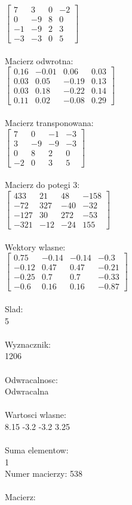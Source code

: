 \documentclass[a4paper,12pt]{article}
\begin{document}
$\begin{bmatrix} 7&3&0&-2\\0&-9&8&0\\-1&-9&2&3\\-3&-3&0&5 \end{bmatrix}$
\\
\\
Macierz odwrotna:\\

$\begin{bmatrix} 0.16&-0.01&0.06&0.03\\0.03&0.05&-0.19&0.13\\0.03&0.18&-0.22&0.14\\0.11&0.02&-0.08&0.29 \end{bmatrix}$
\\
\\
Macierz transponowana:\\

$\begin{bmatrix} 7&0&-1&-3\\3&-9&-9&-3\\0&8&2&0\\-2&0&3&5 \end{bmatrix}$
\\
\\
Macierz do potegi 3:\\

$\begin{bmatrix} 433&21&48&-158\\-72&327&-40&-32\\-127&30&272&-53\\-321&-12&-24&155 \end{bmatrix}$
\\
\\
Wektory wlasne:\\

$\begin{bmatrix} 0.75&-0.14&-0.14&-0.3\\-0.12&0.47&0.47&-0.21\\-0.25&0.7&0.7&-0.33\\-0.6&0.16&0.16&-0.87 \end{bmatrix}$
\\
\\
Slad:\\
5
\\
\\
Wyznacznik:\\
1206
\\
\\
Odwracalnosc:\\
Odwracalna
\\
\\
Wartosci wlasne:\\
8.15 -3.2 -3.2 3.25
\\
\\
Suma elementow:\\
1
\\
\newpage
Numer macierzy:
538
\\
\\
Macierz:\\
\end{document}
